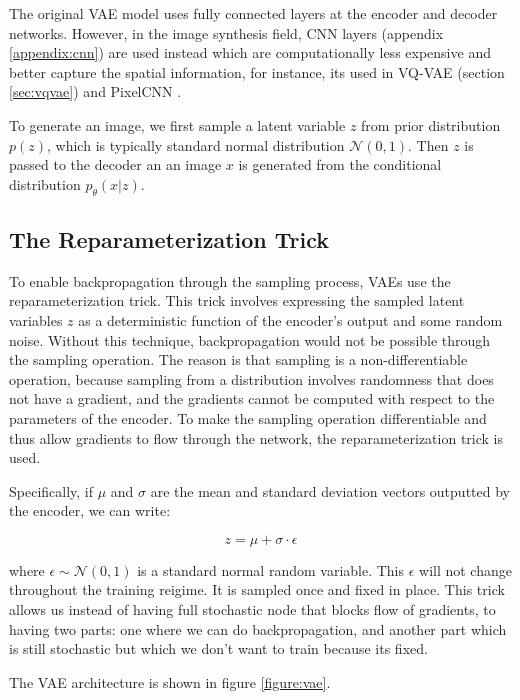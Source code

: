 The original VAE model uses fully connected layers at the encoder and decoder networks. However, in the image synthesis field, CNN layers (appendix \ref{appendix:cnn}) are used instead which are computationally less expensive and better capture the spatial information, for instance, its used in VQ-VAE (section \ref{sec:vqvae}) and PixelCNN \cite{pixelcnn}.

To generate an image, we first sample a latent variable $z$ from prior distribution $p(z)$, which is typically standard normal distribution $\mathcal{N}(0, 1)$. Then $z$ is passed to the decoder an an image $x$ is generated from the conditional distribution $p_\theta (x|z)$. 

\subsection{The Reparameterization Trick}
To enable backpropagation through the sampling process, VAEs use the reparameterization trick. This trick involves expressing the sampled latent variables $z$ as a deterministic function of the encoder's output and some random noise. Without this technique, backpropagation would not be possible through the sampling operation. The reason is that sampling is a non-differentiable operation, because sampling from a distribution involves randomness that does not have a gradient, and the gradients cannot be computed with respect to the parameters of the encoder. To make the sampling operation differentiable and thus allow gradients to flow through the network, the reparameterization trick is used. 

Specifically, if $\mu$ and $\sigma$ are the mean and standard deviation vectors outputted by the encoder, we can write:

\begin{equation}
    z = \mu + \sigma \cdot \epsilon
\end{equation}

where $\epsilon \sim \mathcal{N}(0, 1)$ is a standard normal random variable. This $\epsilon$ will not change throughout the training reigime. It is sampled once and fixed in place. This trick allows us instead of having full stochastic node that blocks flow of gradients, to having two parts: one where we can do backpropagation, and another part which is still stochastic but which we don't want to train because its fixed.



The VAE architecture is shown in figure \ref{figure:vae}.

